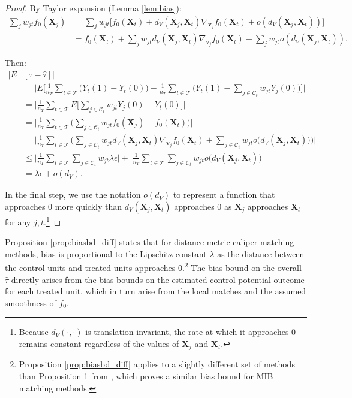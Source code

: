 \documentclass{article}
\newcommand{\Xt}{\mathbf{X}_t}
\newcommand{\Xj}{\mathbf{X}_j}
\newcommand{\vj}{\mathbf{v}_j}
\newcommand{\Ct}{\mathcal{C}_{t}}
\begin{document}
\begin{proof}
    By Taylor expansion (Lemma \ref{lem:bias}):
    \begin{align*}
        \sum_j w_{jt} f_0(\Xj)
        &= \sum_j w_{jt} \Big[ f_0(\Xt) + d_V(\Xj, \Xt) \nabla_{\vj} f_0(\Xt) + o(d_V(\Xj, \Xt)) \Big] \\
        &= f_0(\Xt) + \sum_j w_{jt} d_V(\Xj, \Xt) \nabla_{\vj} f_0(\Xt) + \sum_j w_{jt} o(d_V(\Xj, \Xt)).
    \end{align*}

    Then:
    \begin{align*}
        \big| E &[\tau - \hat{\tau} ] \big| \\
        &= \bigg| E\Big[\frac{1}{n_T}\sum_{t \in \mathcal{T}} \big( Y_t(1) - Y_t(0) \big) - \frac{1}{n_T}\sum_{t \in \mathcal{T}} \big( Y_t(1) - \sum_{j \in \Ct} w_{jt} Y_j(0) \big) \Big] \bigg| \\
        &= \bigg| \frac{1}{n_T} \sum_{t \in \mathcal{T}} 
            E\Big[ \sum_{j \in \Ct} w_{jt} Y_j(0) - Y_t(0) \Big]\bigg| \\
        &= \bigg| \frac{1}{n_T} \sum_{t \in \mathcal{T}} 
            \Big( \sum_{j \in \Ct} w_{jt} f_0(\Xj) - f_0(\Xt) \Big) \bigg| \\
        &= \bigg| \frac{1}{n_T} \sum_{t \in \mathcal{T}} 
            \Big( \sum_{j \in \Ct} w_{jt} d_V(\Xj, \Xt) \nabla_{\vj} f_0(\Xt) 
            + \sum_{j \in \Ct} w_{jt} o\big(d_V(\Xj, \Xt)\big) \Big) \bigg| \\
        &\leq \bigg| \frac{1}{n_T} \sum_{t \in \mathcal{T}} 
            \sum_{j \in \Ct} w_{jt} \lambda \epsilon \bigg|
            + \bigg| \frac{1}{n_T} \sum_{t \in \mathcal{T}} \sum_{j \in \Ct} w_{jt} o\big(d_V(\Xj, \Xt)\big) \bigg| \\
        &= \lambda \epsilon + o(d_V).
    \end{align*}

    In the final step, we use the notation $o(d_V)$ to represent a function that approaches 0 more quickly than $d_V(\Xj, \Xt)$ approaches 0 as $\Xj$ approaches $\Xt$ for any $j, t$.\footnote{Because $d_V(\cdot, \cdot)$ is translation-invariant, the rate at which it approaches 0 remains constant regardless of the values of $\Xj$ and $\Xt$.}
\end{proof}

Proposition \ref{prop:biasbd_diff} states that for distance-metric caliper matching methods, bias is proportional to the Lipschitz constant $\lambda$ as the distance between the control units and treated units approaches 0.\footnote{Proposition \ref{prop:biasbd_diff} applies to a slightly different set of methods than Proposition 1 from \citet{iacus2011multivariate}, which proves a similar bias bound for MIB matching methods.}
The bias bound on the overall $\hat{\tau}$ directly arises from the bias bounds on the estimated control potential outcome for each treated unit, 
which in turn arise from the local matches and the assumed smoothness of $f_0$.
\end{document}
